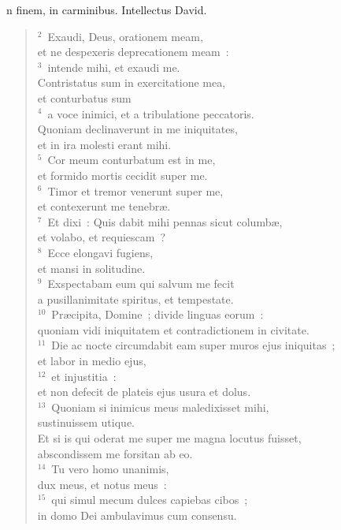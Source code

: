 \bchapter[Psalm]
n finem, in carminibus. Intellectus David.
\begin{verse}${}^{2}$~Exaudi, Deus, orationem meam,\\ et ne despexeris deprecationem meam~:\\
${}^{3}$~intende mihi, et exaudi me.\\ Contristatus sum in exercitatione mea,\\ et conturbatus sum\\
${}^{4}$~a voce inimici, et a tribulatione peccatoris.\\ Quoniam declinaverunt in me iniquitates,\\ et in ira molesti erant mihi.\\
${}^{5}$~Cor meum conturbatum est in me,\\ et formido mortis cecidit super me.\\
${}^{6}$~Timor et tremor venerunt super me,\\ et contexerunt me tenebr\ae .\\
${}^{7}$~Et dixi~: Quis dabit mihi pennas sicut columb\ae ,\\ et volabo, et requiescam~?\\
${}^{8}$~Ecce elongavi fugiens,\\ et mansi in solitudine.\\
${}^{9}$~Exspectabam eum qui salvum me fecit\\ a pusillanimitate spiritus, et tempestate.\\
${}^{10}$~Pr\ae cipita, Domine~; divide linguas eorum~:\\ quoniam vidi iniquitatem et contradictionem in civitate.\\
${}^{11}$~Die ac nocte circumdabit eam super muros ejus iniquitas~;\\ et labor in medio ejus,\\
${}^{12}$~et injustitia~:\\ et non defecit de plateis ejus usura et dolus.\\
${}^{13}$~Quoniam si inimicus meus maledixisset mihi,\\ sustinuissem utique.\\ Et si is qui oderat me super me magna locutus fuisset,\\ abscondissem me forsitan ab eo.\\
${}^{14}$~Tu vero homo unanimis,\\ dux meus, et notus meus~:\\
${}^{15}$~qui simul mecum dulces capiebas cibos~;\\ in domo Dei ambulavimus cum consensu.\\

\end{verse}
